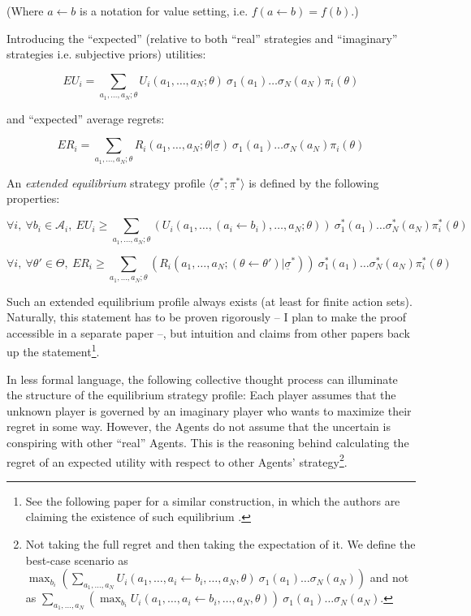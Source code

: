 \documentclass{article}
\begin{document}
(Where $a \leftarrow b$ is a notation for value setting, i.e. $f(a \leftarrow b) = f(b)$.)

Introducing the ``expected'' (relative to both ``real'' strategies and ``imaginary'' strategies i.e. subjective priors) utilities:

\[
EU_i = 
\sum_{a_1,\dots,a_N;\theta} 
U_i(a_1,\dots,a_N;\theta) \ \sigma_1(a_1) \dots \sigma_N(a_N) \pi_i(\theta)
\]

and ``expected'' average regrets:

\[
ER_i =
\sum_{a_1,\dots,a_N;\theta} 
R_i(a_1,\dots,a_N;\theta | \underline{\sigma}) \ \sigma_1(a_1)\dots\sigma_N(a_N) \pi_i(\theta)
\]

An \emph{extended equilibrium} strategy profile $\langle \underline{\sigma}^*; \underline{\pi}^* \rangle$ is defined by the following properties:

\[
\forall i, \
\forall b_i \in \mathcal{A}_i, \ 
EU_i \ge
\sum_{a_1,\dots,a_N;\theta} 
\left (
U_i(a_1,\dots,(a_i \leftarrow b_i),\dots,a_N;\theta)
\right ) \ 
\sigma^*_1(a_1) \dots \sigma^*_N(a_N) \pi^*_i(\theta)
\]

\[
\forall i, \
\forall \theta' \in \Theta, \ 
ER_i \ge
\sum_{a_1,\dots,a_N;\theta} 
\left (
R_i(a_1,\dots,a_N;(\theta \leftarrow \theta') | \underline{\sigma}^*)
\right ) \ 
\sigma^*_1(a_1) \dots \sigma^*_N(a_N) \pi^*_i(\theta)
\]

Such an extended equilibrium profile always exists (at least for finite action sets). Naturally, this statement has to be proven rigorously -- I plan to make the proof accessible in a separate paper --, but intuition and claims from other papers back up the statement\footnote{See the following paper for a similar construction, in which the authors are claiming the existence of such equilibrium \cite{arxiv:RegretMinimizingEquilibria}.}.


In less formal language, the following collective thought process can illuminate the structure of the equilibrium strategy profile:
Each player assumes that the unknown player is governed by an imaginary player who wants to maximize their regret in some way. However, the Agents do not assume that the uncertain is conspiring with other ``real'' Agents. This is the reasoning behind calculating the regret of an expected utility with respect to other Agents' strategy\footnote{Not taking the full regret and then taking the expectation of it. We define the best-case scenario as $\max_{b_i} 
\left (
\sum_{a_1,\dots,a_N} U_i(a_1,\dots,a_i \leftarrow b_i,\dots,a_N,\theta) \ 
\sigma_1(a_1) \dots \sigma_N(a_N)
\right )$
and not as
$ \sum_{a_1,\dots,a_N} \left ( \max_{b_i} U_i(a_1,\dots,a_i \leftarrow b_i,\dots,a_N,\theta) \right ) \ 
\sigma_1(a_1) \dots \sigma_N(a_N)
$.
}.
\end{document}
